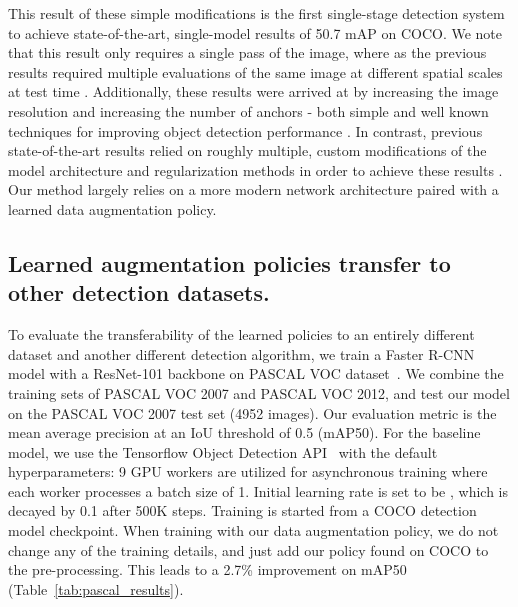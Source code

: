 \documentclass[10pt,twocolumn,letterpaper]{article}
\begin{document}
This result of these simple modifications is the first single-stage detection system to achieve state-of-the-art, single-model results of 50.7 mAP on COCO. We note that this result only requires a single pass of the image, where as the previous results required multiple evaluations of the same image at different spatial scales at test time \cite{Peng_2018_CVPR}. Additionally, these results were arrived at by increasing the image resolution and increasing the number of anchors - both simple and well known techniques for improving object detection performance \cite{yang2018metaanchor, huang2017speed}. In contrast, previous state-of-the-art results relied on roughly multiple, custom modifications of the model architecture and regularization methods in order to achieve these results \cite{Peng_2018_CVPR}. Our method largely relies on a more modern network architecture paired with a learned data augmentation policy. 



\subsection{Learned augmentation policies transfer to other detection datasets.}

To evaluate the transferability of the learned policies to an entirely different dataset and another different detection algorithm, we train a Faster R-CNN~\cite{ren2015faster} model with a ResNet-101 backbone on PASCAL VOC dataset~\cite{everingham2010pascal}. We combine the training sets of PASCAL VOC 2007 and PASCAL VOC 2012, and test our model on the PASCAL VOC 2007 test set (4952 images). Our evaluation metric is the mean average precision at an IoU threshold of 0.5 (mAP50). For the baseline model, we use the Tensorflow Object Detection API~\cite{huang2017speed} with the default hyperparameters: 9 GPU workers are utilized for asynchronous training where each worker processes a batch size of 1. Initial learning rate is set to be , which is decayed by 0.1 after 500K steps. Training is started from a COCO detection model checkpoint. When training with our data augmentation policy, we do not change any of the training details, and just add our policy found on COCO to the pre-processing. This leads to a 2.7\% improvement on mAP50 (Table~\ref{tab:pascal_results}). 
\end{document}
